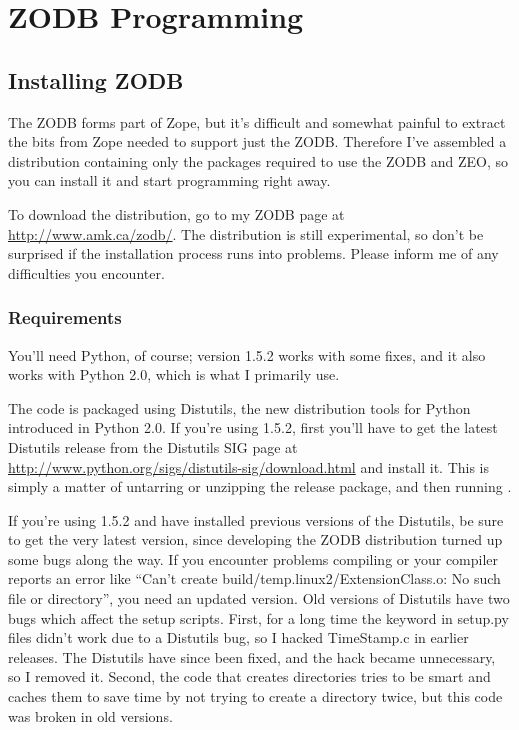 
   

\section{ZODB Programming}

\subsection{Installing ZODB}

The ZODB forms part of Zope, but it's difficult and somewhat painful
to extract the bits from Zope needed to support just the ZODB.
Therefore I've assembled a distribution containing only the packages
required to use the ZODB and ZEO, so you can install it and start
programming right away.

To download the distribution, go to my ZODB page at 
\url{http://www.amk.ca/zodb/}.  
The distribution is still experimental, so don't be surprised if the
installation process runs into problems.  Please inform me of any
difficulties you encounter.

\subsubsection{Requirements}

You'll need Python, of course; version 1.5.2 works with some fixes,
and it also works with Python 2.0, which is what I primarily use.

The code is packaged using Distutils, the new distribution tools for
Python introduced in Python 2.0.  If you're using 1.5.2, first you'll
have to get the latest Distutils release from the Distutils SIG page
at \url{http://www.python.org/sigs/distutils-sig/download.html} and
install it.  This is simply a matter of untarring or unzipping the
release package, and then running .

If you're using 1.5.2 and have installed previous versions of the
Distutils, be sure to get the very latest version, since developing
the ZODB distribution turned up some bugs along the way.  If you
encounter problems compiling  or your compiler reports
an error like ``Can't create build/temp.linux2/ExtensionClass.o: No
such file or directory'', you need an updated version.  Old versions of
Distutils have two bugs which affect the setup scripts.  First, for a
long time the  keyword in setup.py files didn't work due
to a Distutils bug, so I hacked TimeStamp.c in earlier releases.  The
Distutils have since been fixed, and the hack became unnecessary, so I
removed it.  Second, the code that creates directories tries to be
smart and caches them to save time by not trying to create a directory
twice, but this code was broken in old versions.

